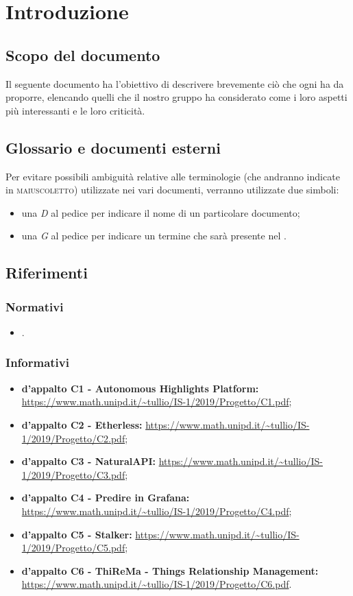 
\section{Introduzione}
\subsection{Scopo del documento}
  Il seguente documento ha l'obiettivo di descrivere brevemente ciò che ogni   ha da proporre, elencando quelli che il nostro gruppo ha considerato come i loro aspetti più interessanti e le loro criticità.
\subsection{Glossario e documenti esterni}
    Per evitare possibili ambiguità relative alle terminologie (che andranno indicate in \textsc{maiuscoletto}) utilizzate nei vari documenti, verranno utilizzate due simboli:
    \begin{itemize}
      \item una \textit{D} al pedice per indicare il nome di un particolare documento;
      \item una \textit{G} al pedice per indicare un termine che sarà presente nel .
    \end{itemize}
\subsection{Riferimenti}
    \subsubsection{Normativi}
    \begin{itemize}
      \item \textbf{}.
    \end{itemize}
    \subsubsection{Informativi}
    \begin{itemize}
      \item \textbf{ d'appalto C1 - Autonomous Highlights Platform:} \url{https://www.math.unipd.it/~tullio/IS-1/2019/Progetto/C1.pdf};
      \item \textbf{ d'appalto C2 - Etherless:} \url{https://www.math.unipd.it/~tullio/IS-1/2019/Progetto/C2.pdf};
      \item \textbf{ d'appalto C3 - NaturalAPI:} \url{https://www.math.unipd.it/~tullio/IS-1/2019/Progetto/C3.pdf};
      \item \textbf{ d'appalto C4 - Predire in Grafana:} \url{https://www.math.unipd.it/~tullio/IS-1/2019/Progetto/C4.pdf};
      \item \textbf{ d'appalto C5 - Stalker:} \url{https://www.math.unipd.it/~tullio/IS-1/2019/Progetto/C5.pdf};
      \item \textbf{ d'appalto C6 - ThiReMa - Things Relationship Management:} \url{https://www.math.unipd.it/~tullio/IS-1/2019/Progetto/C6.pdf}.
    \end{itemize}
